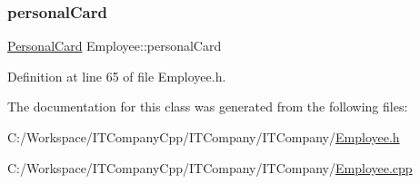 \mbox{\label{class_employee_a3a0668e43e943ba0ac0ad0470de8599a}} 
\subsubsection{\texorpdfstring{personal\+Card}{personalCard}}
{\footnotesize\ttfamily \hyperlink{class_personal_card}{Personal\+Card} Employee\+::personal\+Card\hspace{0.3cm}{\ttfamily [private]}}



Definition at line 65 of file Employee.\+h.



The documentation for this class was generated from the following files\+:\begin{DoxyCompactItemize}
\item 
C\+:/\+Workspace/\+I\+T\+Company\+Cpp/\+I\+T\+Company/\+I\+T\+Company/\hyperlink{_employee_8h}{Employee.\+h}\item 
C\+:/\+Workspace/\+I\+T\+Company\+Cpp/\+I\+T\+Company/\+I\+T\+Company/\hyperlink{_employee_8cpp}{Employee.\+cpp}\end{DoxyCompactItemize}
